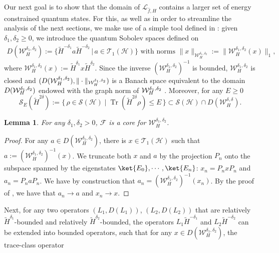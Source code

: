 \documentclass[11pt]{amsart}
\newcommand{\1}{\mathbbm{1}}
\newcommand{\Tr}{\operatorname{Tr}}
\theoremstyle{plain}
\newtheorem{lemma}[theorem]{Lemma}
\theoremstyle{definition}
\theoremstyle{remark}
\numberwithin{equation}{section}
\begin{document}
\noindent Our next goal is to show that the domain of $\mathcal{L}_{\widehat{f},H}$ contains a larger set of energy constrained quantum states. For this, as well as in order to streamline the analysis of the next sections, we make use of a simple tool defined in \cite{gondolf2024energy}: given $\delta_1,\delta_2\ge 0$, we introduce the quantum Sobolev spaces defined on 
\begin{align*}
D(\mathcal{W}_H^{\delta_1,\delta_2}):=\Big\{\widetilde{H}^{-\delta_1}a \widetilde{H}^{-\delta_2}\,\Big|\,a\in\mathscr{T}_1(\mathcal{H})\Big\}\text{ with norms }
\|x\|_{\mathcal{W}_H^{\delta_1,\delta_2}}:=\|\mathcal{W}_H^{\delta_1,\delta_2}(x)\|_1,
\end{align*}
where $\mathcal{W}^{\delta_1,\delta_2}_H(x):=\widetilde{H}^{\delta_1} x \widetilde{H}^{\delta_2}$. Since the inverse $(\mathcal{W}_H^{\delta_1,\delta_2})^{-1}$ is bounded, $\mathcal{W}^{\delta_1,\delta_2}_H$ is closed and $(D(\mathcal{W}_H^{\delta_1,\delta_2}),\|\cdot \|_{\smash{\mathcal{W}_H^{\delta_1,\delta_2}}})$ is a Banach space equivalent to the domain $D(\mathcal{W}^{\delta_1,\delta_2}_{\smash{H}})$ endowed with the graph norm of $\mathcal{W}^{\delta_1,\delta_2}_{\smash{H}}$
\cite[Theorem 2.2]{gondolf2024energy}. Moreover, for any $E\ge 0$
\[
\mathscr{S}_E(\widetilde{H}^{2\delta})
:=\bigl\{\, \rho \in \mathscr{S}(\mathcal{H}) \;\big|\; \Tr(\widetilde{H}^{2\delta}\rho) \le E \,\bigr\}\subset \mathscr{S}(\mathcal{H})\cap D(\mathcal{W}_H^{\delta,\delta}).
\]
\begin{lemma}\label{mathFcoreW}
For any $\delta_1,\delta_2>0$, $\mathscr{F}$ is a core for $\mathcal{W}_H^{\delta_1,\delta_2}$.
\end{lemma}
\begin{proof}
For any $a\in D(\mathcal{W}_H^{\delta_1,\delta_2})$, there is $x\in\mathscr{T}_1(\mathcal{H})$ such that $a:=(\mathcal{W}_H^{\delta_1,\delta_2})^{-1}(x)$. We truncate both $x$ and $a$ by the projection $P_n$ onto the subspace spanned by the eigenstates $\ket{E_0},\cdots,\ket{E_{n}}$: $x_n=P_nxP_n$ and $a_n=P_naP_n$. We have by construction that $a_n=(\mathcal{W}_H^{\delta_1,\delta_2})^{-1}(x_n)$. By the proof of , we have that $a_n\to a$ and $x_n\to x$. 
\end{proof}
Next, for any two operators $(L_1,D(L_1))$, $(L_2,D(L_2))$ that are relatively $\widetilde{H}^{\delta_1}$-bounded and relatively $\widetilde{H}^{\delta_2}$-bounded, the operators $L_1\widetilde{H}^{-\delta_1}$ and $L_2\widetilde{H}^{-\delta_2}$ can be extended into bounded operators, such that for any $x\in D(\mathcal{W}_H^{\delta_1,\delta_2})$, the trace-class operator 
\end{document}
